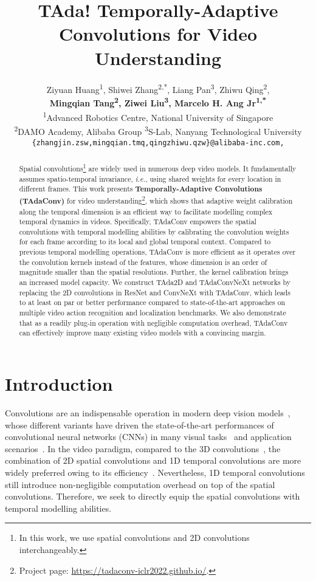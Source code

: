 \documentclass{article} \usepackage{iclr2022_conference,times}
\title{TAda! Temporally-Adaptive Convolutions for Video Understanding}
\author{Ziyuan Huang\textsuperscript{1}, \quad Shiwei Zhang\textsuperscript{2,*}, \quad Liang Pan\textsuperscript{3}, \quad Zhiwu Qing\textsuperscript{2}, \\
\textbf{Mingqian Tang\textsuperscript{2}, \quad Ziwei Liu\textsuperscript{3}, \quad Marcelo H. Ang Jr\textsuperscript{1,*}}\\
\textsuperscript{1}Advanced Robotics Centre, National University of Singapore\\
\textsuperscript{2}DAMO Academy, Alibaba Group \quad
\textsuperscript{3}S-Lab, Nanyang Technological University\\
\fontsize{8}{8}{
\texttt{ziyuan.huang@u.nus.edu,}}
\fontsize{8}{8}
{\texttt{\{zhangjin.zsw,mingqian.tmq,qingzhiwu.qzw\}@alibaba-inc.com,}}\\
\fontsize{8}{8}{
\texttt{\{liang.pan, ziwei.liu\}@ntu.edu.sg, mpeangh@nus.edu.sg}}
}
\begin{document}
\maketitle

\begin{abstract}
Spatial convolutions\footnote{In this work, we use spatial convolutions and 2D convolutions interchangeably.} are widely used in numerous deep video models.
It fundamentally assumes spatio-temporal invariance, \textit{i.e.}, using shared weights for every location in different frames.
This work presents \textbf{Temporally-Adaptive Convolutions (TAdaConv)} for video understanding\footnote{Project page: \scriptsize{\url{https://tadaconv-iclr2022.github.io/}}.}, which shows that adaptive weight calibration along the temporal dimension is an efficient way to facilitate modelling complex temporal dynamics in videos.
Specifically, TAdaConv empowers the spatial convolutions with temporal modelling abilities by calibrating the convolution weights for each frame according to its local and global temporal context.
Compared to previous temporal modelling operations, TAdaConv is more efficient as it operates over the convolution kernels instead of the features, whose dimension is an order of magnitude smaller than the spatial resolutions.
Further, the kernel calibration brings an increased model capacity.
We construct TAda2D and TAdaConvNeXt networks by replacing the 2D convolutions in ResNet and ConvNeXt with TAdaConv, which leads to at least on par or better performance compared to state-of-the-art approaches on multiple video action recognition and localization benchmarks.
We also demonstrate that as a readily plug-in operation with negligible computation overhead, TAdaConv can effectively improve many existing video models with a convincing margin.
\end{abstract}

\section{Introduction}

Convolutions are an indispensable operation in modern deep vision models~\citep{resnet,inception,alexnet}, whose different variants have driven the state-of-the-art performances of convolutional neural networks (CNNs) in many visual tasks~\citep{resnext,deformable,nes} and application scenarios~\citep{mobilenets,condconv}. 
In the video paradigm, compared to the 3D convolutions~\citep{c3d}, the combination of 2D spatial convolutions and 1D temporal convolutions are more widely preferred owing to its efficiency~\citep{r21d,p3d}.
Nevertheless, 1D temporal convolutions still introduce non-negligible computation overhead on top of the spatial convolutions. Therefore, we seek to directly equip the spatial convolutions with temporal modelling abilities.
\end{document}
